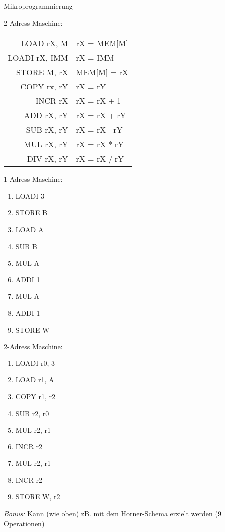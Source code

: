 \documentclass{exercisesheet}
\begin{document}
\begin{exercise*}{Mikroprogrammierung}
\begin{multicols*}{2}
    2-Adress Maschine:\\
    \begin{tabular}{|r|l|}
      \hline
      LOAD rX, M    & rX = MEM[M]  \\
      LOADI rX, IMM & rX = IMM     \\
      STORE M, rX   & MEM[M] = rX  \\
      COPY rx, rY   & rX = rY      \\
      INCR rX       & rX = rX + 1  \\
      ADD rX, rY    & rX = rX + rY \\
      SUB rX, rY    & rX = rX - rY \\
      MUL rX, rY    & rX = rX * rY \\
      DIV rX, rY    & rX = rX / rY \\
      \hline
    \end{tabular}
  \end{multicols*}
\end{exercise*}

\begin{solution*}
  \begin{multicols*}{2}
    1-Adress Maschine:
    \begin{enumerate}
      \item LOADI 3
      \item STORE B
      \item LOAD A
      \item SUB B
      \item MUL A
      \item ADDI 1
      \item MUL A
      \item ADDI 1
      \item STORE W
    \end{enumerate}

    2-Adress Maschine:
    \begin{enumerate}
      \item LOADI r0, 3
      \item LOAD r1, A
      \item COPY r1, r2
      \item SUB r2, r0
      \item MUL r2, r1
      \item INCR r2
      \item MUL r2, r1
      \item INCR r2
      \item STORE W, r2
    \end{enumerate}
  \end{multicols*}

  \textit{Bonus:} Kann (wie oben) zB. mit dem Horner-Schema erzielt werden (9 Operationen)
\end{solution*}
\end{document}
